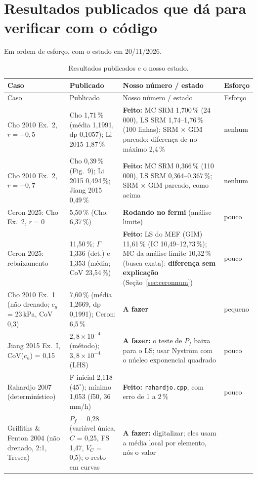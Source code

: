\documentclass[11pt,a4paper]{article}
\newcommand{\sci}[2]{\ensuremath{#1\times10^{#2}}}
\begin{document}
\section{Resultados publicados que dá para verificar com o código}\label{sec:verif}
Em ordem de esforço, com o estado em 20/11/2026.
{\small\setlength{\tabcolsep}{4pt}
\begin{longtable}{L{3.0cm}L{4.4cm}L{6.4cm}L{1.6cm}}
\caption{Resultados publicados e o nosso estado.}\label{tab:verif}\\
\toprule
Caso & Publicado & Nosso número / estado & Esforço \\
\midrule\endfirsthead
\toprule Caso & Publicado & Nosso número / estado & Esforço \\ \midrule\endhead
\bottomrule\endlastfoot
Cho 2010 Ex.~2, $r = -0{,}5$ & Cho 1,71\,\% (média 1,1991, dp 0,1057); Li 2015 1,87\,\% & \textbf{Feito:} MC SRM
  1,700\,\% (24\,000), LS SRM 1,74--1,76\,\% (100 linhas); SRM $\times$ GIM pareado: diferença de no máximo 2,4\,\% &
  nenhum \\
Cho 2010 Ex.~2, $r = -0{,}7$ & Cho 0,39\,\% (Fig.~9); Li 2015 0,494\,\%; Jiang 2015 0,49\,\% & \textbf{Feito:} MC SRM
  0,366\,\% (110\,000), LS SRM 0,364--0,367\,\%; SRM $\times$ GIM pareado, como acima & nenhum \\
Ceron 2025: Cho Ex.~2, $r = 0$ & 5,50\,\% (Cho: 6,37\,\%) & \textbf{Rodando no fermi} (análise limite) & pouco \\
Ceron 2025: rebaixamento & 11,50\,\%; $\Gamma$ 1,336 (det.) e 1,353 (média; CoV 23,54\,\%) & \textbf{Feito:} LS do MEF
  (GIM) 11,61\,\% (IC 10,49--12,73\,\%); MC da análise limite 10,32\,\% (busca exata): \textbf{diferença sem
  explicação} (Seção~\ref{sec:ceronnum}) & pouco \\
Cho 2010 Ex.~1 (não drenado; $c_u$ = 23\,kPa, CoV 0,3) & 7,60\,\% (média 1,2669, dp 0,1991); Ceron: 6,5\,\% &
  \textbf{A fazer} & pequeno \\
Jiang 2015 Ex.~I, CoV($c_u$) = 0,15 & \sci{2{,}8}{-4} (método); \sci{3{,}8}{-4} (LHS) & \textbf{A fazer:} o teste de
  $P_f$ baixa para o LS; usar Nyström com o núcleo exponencial quadrado & pouco \\
Rahardjo 2007 (determinístico) & F inicial 2,118 ($45^\circ$); mínimo 1,053 (f50, 36\,mm/h) & \textbf{Feito:}
  \texttt{rahardjo.cpp}, com erro de 1 a 2\,\% & pouco \\
Griffiths \& Fenton 2004 (não drenado, 2:1, Tresca) & $P_f$ = 0,28 (variável única, $C$ = 0,25, FS 1,47,
  $V_C$ = 0,5); o resto em curvas & \textbf{A fazer:} digitalizar; eles usam a média local por elemento, nós o valor

\end{longtable}}
\end{document}

